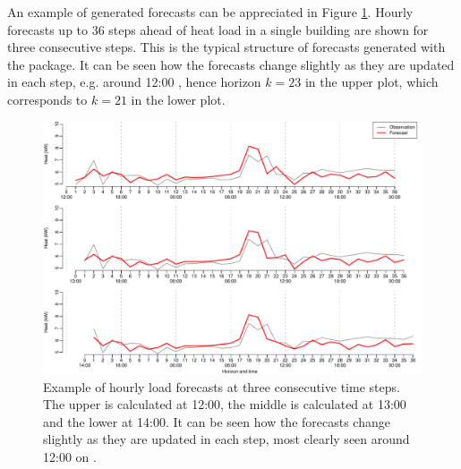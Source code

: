 An example of generated forecasts can be appreciated in Figure
\ref{fig:forecastsExample}. Hourly forecasts up to 36 steps ahead of heat load
in a single building are shown for three consecutive steps. This is the typical
structure of forecasts generated with the package. It can be seen how
the forecasts change slightly as they are updated in each step, e.g. around
12:00 , hence horizon $k=23$ in the upper plot, which corresponds to $k=21$ in the lower plot.
\begin{figure}
\centering
\begin{knitrout}
\color{fgcolor}
\includegraphics[width=1\linewidth]{tmp/genfig/unnamed-chunk-8-1} 
\end{knitrout}
\caption{Example of hourly load forecasts at three
  consecutive time steps. The upper is calculated at 12:00, the middle is
calculated at 13:00 and the lower at 14:00. It can be seen how the forecasts change
slightly as they are updated in each step, most clearly seen around 12:00 on .}\label{fig:forecastsExample}
\end{figure}

\FloatBarrier

